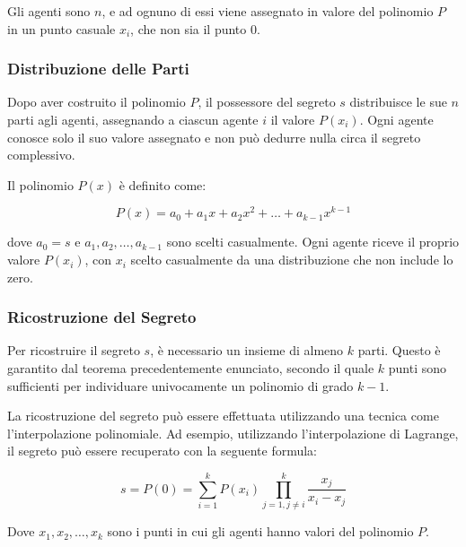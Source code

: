 Gli agenti sono $n$, e ad ognuno di essi viene assegnato in valore del polinomio $P$ in un punto
casuale $x_i$, che non sia il punto $0$. 

\subsubsection{Distribuzione delle Parti}

Dopo aver costruito il polinomio $P$, il possessore del segreto $s$ distribuisce le sue $n$ parti
agli agenti, assegnando a ciascun agente $i$ il valore $P(x_i)$. Ogni agente conosce solo il suo
valore assegnato e non può dedurre nulla circa il segreto complessivo.

Il polinomio $P(x)$ è definito come:

\[ P(x) = a_0 + a_1x + a_2x^2 + \dots + a_{k-1}x^{k-1} \]

dove $a_0 = s$ e $a_1, a_2, \dots, a_{k-1}$ sono scelti casualmente. Ogni agente riceve il proprio
valore $P(x_i)$, con $x_i$ scelto casualmente da una distribuzione che non include lo zero.

\subsubsection{Ricostruzione del Segreto}

Per ricostruire il segreto $s$, è necessario un insieme di almeno $k$ parti. Questo è garantito
dal teorema precedentemente enunciato, secondo il quale $k$ punti sono sufficienti per individuare
univocamente un polinomio di grado $k-1$.

La ricostruzione del segreto può essere effettuata utilizzando una tecnica come l'interpolazione
polinomiale. Ad esempio, utilizzando l'interpolazione di Lagrange, il segreto può essere recuperato
con la seguente formula:

\[ s = P(0) = \sum_{i=1}^{k} P(x_i) \prod_{j=1, j\neq i}^{k} \frac{x_j}{x_i - x_j} \]

Dove $x_1, x_2, \dots, x_k$ sono i punti in cui gli agenti hanno valori del polinomio $P$.